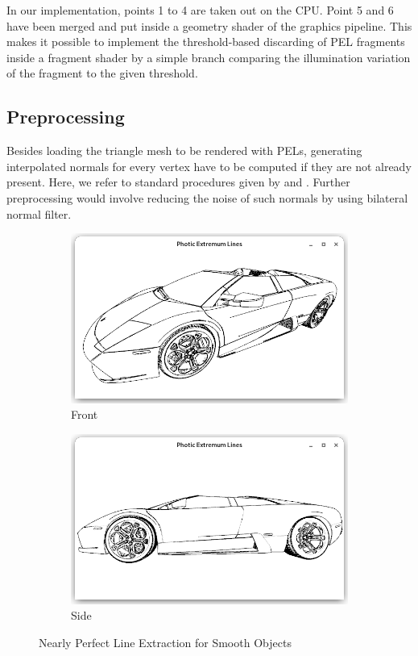 \documentclass[9pt,fleqn,twoside,twocolumn]{stdglobal}
\begin{document}
    \noindent
    In our implementation, points 1 to 4 are taken out on the CPU.
    Point 5 and 6 have been merged and put inside a geometry shader of the graphics pipeline.
    This makes it possible to implement the threshold-based discarding of PEL fragments inside a fragment shader by a simple branch comparing the illumination variation of the fragment to the given threshold.

  \subsection{Preprocessing}
    Besides loading the triangle mesh to be rendered with PELs, generating interpolated normals for every vertex have to be computed if they are not already present.
    Here, we refer to standard procedures given by \textcite{max1999} and \textcite{jin2005}.
    Further preprocessing would involve reducing the noise of such normals by using bilateral normal filter.

    \begin{figure}[h]
      \centering
      \begin{subfigure}[b]{\linewidth}
        \centering
        \includegraphics[width=\textwidth,trim={15px 15 15 50},clip]{images/lamborghini-front.png}
        \caption{Front}
      \end{subfigure}
      \begin{subfigure}[b]{\linewidth}
        \centering
        \includegraphics[width=\textwidth,trim={15px 15 15 50},clip]{images/lamborghini-side.png}
        \caption{Side}
      \end{subfigure}
      \caption{Nearly Perfect Line Extraction for Smooth Objects}
    \end{figure}
\end{document}

